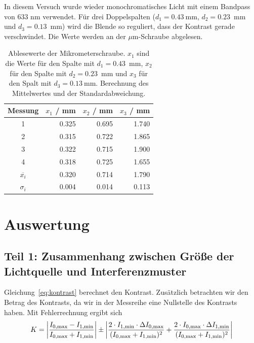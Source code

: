 \documentclass{article}
\begin{document}
In diesem Versuch wurde wieder monochromatisches Licht mit einem Bandpass von 633 nm verwendet. Für drei Doppelspalten ($d_1=0.43~$mm, $d_2=0.23$~mm und $d_3=0.13$~mm) wird die Blende so reguliert, dass der Kontrast gerade verschwindet. Die Werte werden an der $\mu$m-Schraube abgelesen.

\begin{table}[H]
\caption{Ablesewerte der Mikrometerschraube. $x_1$ sind die Werte für den Spalte mit $d_1=0.43$~mm, $x_2$ für den Spalte mit $d_2=0.23$~mm und $x_3$ für den Spalt mit $d_3=0.13~$mm. Berechnung des Mittelwertes und der Standardabweichung.}
\begin{tabular}{c|rrr}
Messung & $x_1$ / mm & $x_2$ / mm & $x_3$ / mm \\
\hline
1 & 0.325 & 0.695 & 1.740 \\
2 & 0.315 & 0.722 & 1.865 \\
3 & 0.322 & 0.715 & 1.900 \\
4 & 0.318 & 0.725 & 1.655 \\
\hline 
$\overline{x_i}$ & 0.320 & 0.714 & 1.790 \\
$\sigma_i$ & 0.004 & 0.014 & 0.113
\end{tabular}

\end{table}



\section{Auswertung}



\subsection{Teil 1: Zusammenhang zwischen Größe der Lichtquelle und Interferenzmuster}

Gleichung~\eqref{eq:kontrast} berechnet den Kontrast. Zusätzlich betrachten wir den Betrag des Kontrasts, da wir in der Messreihe eine Nullstelle des Kontrasts haben. Mit Fehlerrechnung ergibt sich
\begin{align*}
K = \left|\frac{I_\text{0,max}-I_\text{1,min}}{I_\text{0,max}+I_\text{1,min}} \right| \pm \left| \frac{ 2\cdot I_{1,\text{min}} \cdot \Delta I_{0,\text{max}} }{(I_\text{0,max}+I_\text{1,\text{min}})^2}  + \frac{ 2\cdot I_{0,\text{max}} \cdot \Delta I_{1,\text{min}} }{(I_\text{0,max}+I_\text{1,min})^2} \right|
\end{align*}
\end{document}
